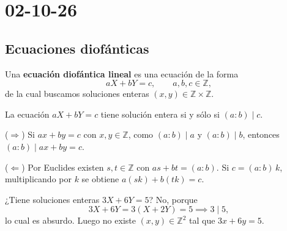 \chapter{02-10-26}

\section{Ecuaciones diofánticas}

\begin{definicion}
Una \textbf{ecuación diofántica lineal} es una ecuación de la forma
\[
aX + bY = c, \qquad a,b,c \in \mathbb{Z},
\]
de la cual buscamos soluciones enteras $(x,y)\in\mathbb{Z}\times\mathbb{Z}$.
\end{definicion}

\begin{proposicion}
La ecuación $aX+bY=c$ tiene solución entera si y sólo si $(a:b) \mid c$.
\end{proposicion}

\begin{demostracion}
($\Rightarrow$) Si $ax+by=c$ con $x,y\in\mathbb{Z}$, como $(a:b)\mid a$ y
$(a:b)\mid b$, entonces $(a:b)\mid ax+by=c$.

($\Leftarrow$) Por Euclides existen $s,t\in\mathbb{Z}$ con $as+bt=(a:b)$. Si
$c=(a:b)\,k$, multiplicando por $k$ se obtiene $a(sk)+b(tk)=c$.
\end{demostracion}

\begin{ejemplo}
¿Tiene soluciones enteras $3X+6Y=5$? No, porque
\[
3X+6Y = 3(X+2Y) = 5 \implies 3 \mid 5,
\]
lo cual es absurdo. Luego no existe $(x,y)\in\mathbb{Z}^2$ tal que $3x+6y=5$.
\end{ejemplo}

